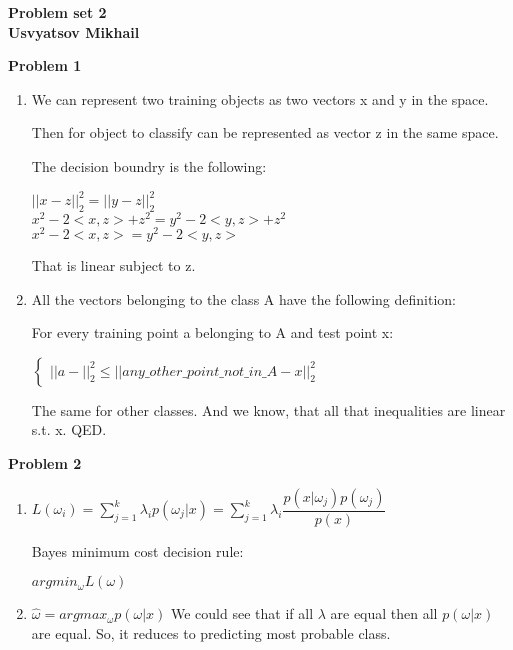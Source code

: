 \documentclass[12pt]{article}
\begin{document}
	\begin{center}
		\textbf{Problem set 2\\ Usvyatsov Mikhail}
	\end{center}
		
	\bigskip
	
	\textbf{Problem 1}
	
	\begin{enumerate}
		\item
			We can represent two training objects as two vectors x and y in the space.
			
			Then for object to classify can be represented as vector z in the same space.
			
			The decision boundry is the following:
			
			$||x - z||_2^2 = ||y - z||_2^2$\\
			$x^2 - 2<x,z> + z^2 = y^2 - 2<y,z> + z^2$\\
			$x^2 - 2<x,z> = y^2 - 2<y,z>$
			
			That is linear subject to z.
		\item
			All the vectors belonging to the class A have the following definition:
			
			For every training point a belonging to A and test point x:

			$\begin{cases}
				 ||a - ||_2^2 \leq ||any\_other\_point\_not\_in\_A - x||_2^2
			\end{cases}$
			
			The same for other classes. And we know, that all that inequalities are linear s.t. x. QED.
	\end{enumerate}
	
	\textbf{Problem 2}
	
		\begin{enumerate}
			\item
				$L(\omega_i) = \sum_{j = 1}^{k} \lambda_i p(\omega_j|x) = \sum_{j = 1}^{k} \lambda_i \dfrac{p(x|\omega_j) p(\omega_j)}{p(x)}$
				
				Bayes minimum cost decision rule:
				
				$argmin_{\omega} L(\omega)$
			\item
				$\hat{\omega} =  argmax_{\omega} p(\omega | x) $
				We could see that if all $\lambda$ are equal then all $p(\omega | x)$ are equal. So, it reduces to predicting most probable class.
		\end{enumerate}
	
\end{document}
